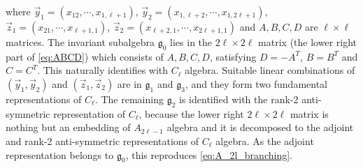 where $ \vec{y}_1 = (x_{12}, \cdots, x_{1,\ell+1}) $, $ \vec{y}_2 = (x_{1,\ell+2}, \cdots, x_{1,2\ell+1}) $, $ \vec{z}_1 = (x_{21}, \cdots, x_{\ell+1,1}) $, $ \vec{z}_2 = (x_{\ell+2,1}, \cdots, x_{2\ell+1, 1}) $ and $ A, B, C, D $ are $ \ell \times \ell $ matrices. The invariant subalgebra $ \mathfrak{g}_0 $ lies in the $ 2\ell \times 2 \ell $ matrix (the lower right part of \eqref{eq:ABCD}) which consists of $A, B, C, D $, satisfying $ D = -A^T $, $ B = B^T $ and $ C = C^T $. 
This naturally identifies with $ C_\ell $ algebra. Suitable linear combinations of $ (\vec{y}_1, \vec{y}_2) $ and $ (\vec{z}_1, \vec{z}_2) $ are in $ \mathfrak{g}_1 $ and $ \mathfrak{g}_3 $, and they form two fundamental representations of $ C_\ell $. The remaining $ \mathfrak{g}_2 $ is identified with the rank-2 anti-symmetric representation of $ C_\ell $, because the lower right $ 2\ell \times 2\ell $ matrix is nothing but an embedding of $ A_{2\ell-1} $ algebra and it is decomposed to the adjoint and rank-2 anti-symmetric representations of $ C_\ell $ algebra. As the adjoint representation belongs to $\mathfrak{g}_0$, this reproduces \eqref{eq:A_2l_branching}.

